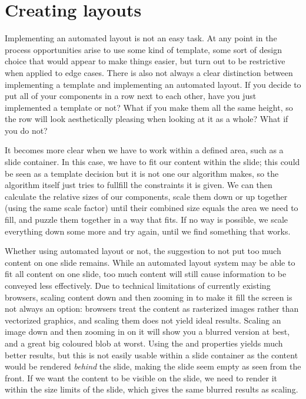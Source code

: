   \section{Creating layouts}

   Implementing an automated layout is not an easy task. At any point in the
   process opportunities arise to use some kind of template, some sort of
   design choice that would appear to make things easier, but turn out to be
   restrictive when applied to edge cases. There is also not always a clear
   distinction between implementing a template and implementing an automated
   layout. If you decide to put all of your components in a row next to each
   other, have you just implemented a template or not? What if you make them
   all the same height, so the row will look aesthetically pleasing when
   looking at it as a whole? What if you do not?

   It becomes more clear when we have to work within a defined area, such as a
   slide container. In this case, we have to fit our content within the slide;
   this could be seen as a template decision but it is not one our algorithm
   makes, so the algorithm itself just tries to fullfill the constraints it is
   given. We can then calculate the relative sizes of our components, scale
   them down or up together (using the same scale factor) until their combined
   size equals the area we need to fill, and puzzle them together in a way that
   fits. If no way is possible, we scale everything down some more and try
   again, until we find something that works.

   Whether using automated layout or not, the suggestion to not put too much
   content on one slide remains. While an automated layout system may be able
   to fit all content on one slide, too much content will still cause
   information to be conveyed less effectively. Due to technical limitations of
   currently existing browsers, scaling content down and then zooming in to
   make it fill the screen is not always an option: browsers treat the content
   as rasterized images rather than vectorized graphics, and scaling them does
   not yield ideal results. Scaling an image down and then zooming in on it
   will show you a blurred version at best, and a great big coloured blob at
   worst. Using the  and  properties
   yields much better results, but this is not easily usable within a slide
   container as the content would be rendered \emph{behind} the slide, making
   the slide seem empty as seen from the front. If we want the content to be
   visible on the slide, we need to render it within the size limits of the
   slide, which gives the same blurred results as scaling.

